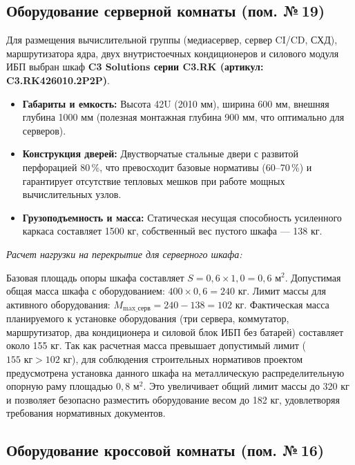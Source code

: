 \documentclass[a4paper,oneside,14pt]{extreport}
\begin{document}
\subsection{Оборудование серверной комнаты (пом. №\,19)}

Для размещения вычислительной группы (медиасервер, сервер CI/CD, СХД), маршрутизатора ядра, двух внутристоечных кондиционеров и силового модуля ИБП выбран шкаф \textbf{C3 Solutions серии C3.RK (артикул: C3.RK426010.2P2P)}.
\begin{itemize}
    \item \textbf{Габариты и емкость:} Высота 42U (2010 мм), ширина 600 мм, внешняя глубина 1000 мм (полезная монтажная глубина 900 мм, что оптимально для серверов).
    \item \textbf{Конструкция дверей:} Двустворчатые стальные двери с развитой перфорацией 80\,\%, что превосходит базовые нормативы (60--70\,\%) и гарантирует отсутствие тепловых мешков при работе мощных вычислительных узлов.
    \item \textbf{Грузоподъемность и масса:} Статическая несущая способность усиленного каркаса составляет 1500 кг, собственный вес пустого шкафа --- 138 кг.
\end{itemize}

\textit{Расчет нагрузки на перекрытие для серверного шкафа:}

Базовая площадь опоры шкафа составляет $S = 0{,}6 \times 1{,}0 = 0{,}6 \text{ м}^2$.
Допустимая общая масса шкафа с оборудованием: $400 \times 0{,}6 = 240 \text{ кг}$.
Лимит массы для активного оборудования: $M_{\text{max\_серв}} = 240 - 138 = 102 \text{ кг}$.
Фактическая масса планируемого к установке оборудования (три сервера, коммутатор, маршрутизатор, два кондиционера и силовой блок ИБП без батарей) составляет около 155 кг. Так как расчетная масса превышает допустимый лимит ($155 \text{ кг} > 102 \text{ кг}$), для соблюдения строительных нормативов проектом предусмотрена установка данного шкафа на металлическую распределительную опорную раму площадью $0{,}8 \text{ м}^2$. Это увеличивает общий лимит массы до 320 кг и позволяет безопасно разместить оборудование весом до 182 кг, удовлетворяя требования нормативных документов.

\subsection{Оборудование кроссовой комнаты (пом. №\,16)}
\end{document}
